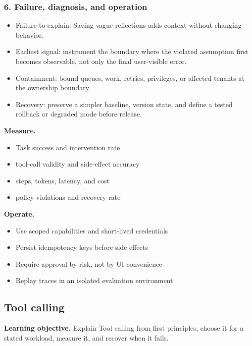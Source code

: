 \subsubsection*{6. Failure, diagnosis, and operation}
\begin{itemize}
\item Failure to explain: Saving vague reflections adds context without changing behavior.
\item Earliest signal: instrument the boundary where the violated assumption first becomes observable, not only the final user-visible error.
\item Containment: bound queues, work, retries, privileges, or affected tenants at the ownership boundary.
\item Recovery: preserve a simpler baseline, version state, and define a tested rollback or degraded mode before release.
\end{itemize}
\textbf{Measure.}\begin{itemize}
\item Task success and intervention rate
\item tool-call validity and side-effect accuracy
\item steps, tokens, latency, and cost
\item policy violations and recovery rate
\end{itemize}
\textbf{Operate.}\begin{itemize}
\item Use scoped capabilities and short-lived credentials
\item Persist idempotency keys before side effects
\item Require approval by risk, not by UI convenience
\item Replay traces in an isolated evaluation environment
\end{itemize}
\subsection{Tool calling}
\textbf{Learning objective.} Explain Tool calling from first principles, choose it for a stated workload, measure it, and recover when it fails.
